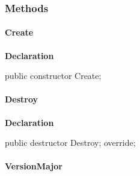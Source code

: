 \documentclass{report}
\newif\ifpdf
\begin{document}
\subsubsection*{\large{\textbf{Methods}}\normalsize\hspace{1ex}\hfill}
\paragraph*{Create}\hspace*{\fill}

\label{RegExpr.TRegExpr-Create}
\begin{list}{}{
\setlength{\itemindent}{0cm}
\setlength{\listparindent}{0cm}
\setlength{\leftmargin}{\evensidemargin}
\addtolength{\leftmargin}{\tmplength}
\settowidth{\labelsep}{X}
\addtolength{\leftmargin}{\labelsep}
\setlength{\labelwidth}{\tmplength}
}
\item[\textbf{Declaration}\hfill]
\ifpdf
\begin{flushleft}
\fi
\begin{ttfamily}
public constructor Create;\end{ttfamily}

\ifpdf
\end{flushleft}
\fi

\end{list}
\paragraph*{Destroy}\hspace*{\fill}

\label{RegExpr.TRegExpr-Destroy}
\begin{list}{}{
\setlength{\itemindent}{0cm}
\setlength{\listparindent}{0cm}
\setlength{\leftmargin}{\evensidemargin}
\addtolength{\leftmargin}{\tmplength}
\settowidth{\labelsep}{X}
\addtolength{\leftmargin}{\labelsep}
\setlength{\labelwidth}{\tmplength}
}
\item[\textbf{Declaration}\hfill]
\ifpdf
\begin{flushleft}
\fi
\begin{ttfamily}
public destructor Destroy; override;\end{ttfamily}

\ifpdf
\end{flushleft}
\fi

\end{list}
\paragraph*{VersionMajor}\hspace*{\fill}
\end{document}
